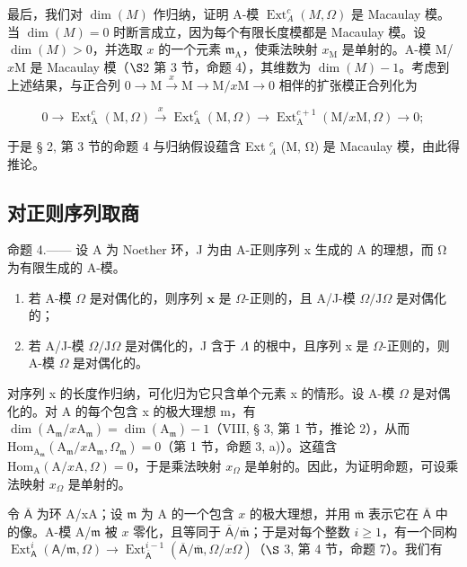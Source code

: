 最后，我们对 \(\dim(M)\) 作归纳，证明 A-模 \(\operatorname{Ext}_{A}^{c}(M,\Omega)\) 是 Macaulay 模。当 \(\dim(M)=0\) 时断言成立，因为每个有限长度模都是 Macaulay 模。设 \(\dim(M)>0\)，并选取 \(x\) 的一个元素 \(\mathfrak{m}_{\mathrm{A}}\)，使乘法映射 \(x_{\mathrm{M}}\) 是单射的。A-模 M/\(x\mathrm{M}\) 是 Macaulay 模（\(\S 2\) 第 3 节，命题 4），其维数为 \(\dim(M)-1\)。考虑到上述结果，与正合列 \(0\to\mathrm{M}\xrightarrow{x}\mathrm{M}\longrightarrow\mathrm{M}/x\mathrm{M}\to0\) 相伴的扩张模正合列化为

\[
0 \to \operatorname{Ext} _ {\mathrm{A}} ^ {c} (\mathrm{M}, \Omega) \xrightarrow {x} \operatorname{Ext} _ {\mathrm{A}} ^ {c} (\mathrm{M}, \Omega) \longrightarrow \operatorname{Ext} _ {\mathrm{A}} ^ {c + 1} (\mathrm{M} / x \mathrm{M}, \Omega) \to 0;
\]

于是 § 2, 第 3 节的命题 4 与归纳假设蕴含 Ext \(_{A}^{c}\) (M, Ω) 是 Macaulay 模，由此得推论。

\subsection{对正则序列取商}

命题 4.—— 设 A 为 Noether 环，J 为由 A-正则序列 x 生成的 A 的理想，而 Ω 为有限生成的 A-模。

\begin{enumerate}
\def\labelenumi{\alph{enumi})}
\item
  若 A-模 \(\Omega\) 是对偶化的，则序列 \(\mathbf{x}\) 是 \(\Omega\)-正则的，且 A/J-模 \(\Omega/\mathrm{J}\Omega\) 是对偶化的；
\item
  若 A/J-模 \(\Omega/\mathrm{J}\Omega\) 是对偶化的，J 含于 \(\Lambda\) 的根中，且序列 x 是 \(\Omega\)-正则的，则 A-模 \(\Omega\) 是对偶化的。
\end{enumerate}

对序列 x 的长度作归纳，可化归为它只含单个元素 x 的情形。设 A-模 \(\Omega\) 是对偶化的。对 A 的每个包含 x 的极大理想 m，有 \(\dim(\mathrm{A}_{\mathfrak{m}}/x\mathrm{A}_{\mathfrak{m}})=\dim(\mathrm{A}_{\mathfrak{m}})-1\)（VIII, § 3, 第 1 节，推论 2），从而 \(\mathrm{Hom}_{\mathrm{A}_{\mathfrak{m}}}\left(\mathrm{A}_{\mathfrak{m}} / x\mathrm{A}_{\mathfrak{m}}, \Omega_{\mathfrak{m}}\right) = 0\)（第 1 节，命题 3, a)）。这蕴含 \(\mathrm{Hom}_{\mathrm{A}}(\mathrm{A} / x\mathrm{A}, \Omega) = 0\)，于是乘法映射 \(x_{\Omega}\) 是单射的。因此，为证明命题，可设乘法映射 \(x_{\Omega}\) 是单射的。

令 \(\overline{\mathsf{A}}\) 为环 A/xA；设 \(\mathfrak{m}\) 为 A 的一个包含 \(x\) 的极大理想，并用 \(\overline{\mathfrak{m}}\) 表示它在 \(\overline{\mathsf{A}}\) 中的像。A-模 A/\(\mathfrak{m}\) 被 \(x\) 零化，且等同于 \(\overline{\mathsf{A}}/\overline{\mathfrak{m}}\)；于是对每个整数 \(i \geqslant 1\)，有一个同构 \(\operatorname{Ext}_{\mathsf{A}}^{i}(\mathsf{A}/\mathfrak{m}, \Omega) \longrightarrow \operatorname{Ext}_{\overline{\mathsf{A}}}^{i-1}(\overline{\mathsf{A}}/\overline{\mathfrak{m}}, \Omega/x\Omega)\)（\(\S\) 3, 第 4 节，命题 7）。我们有

